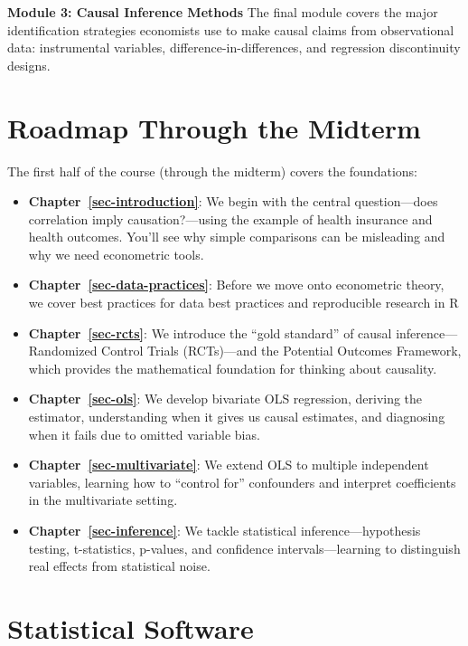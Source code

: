 \documentclass[
  letterpaper,
  DIV=11,
  numbers=noendperiod]{scrreprt}
\begin{document}
\textbf{Module 3: Causal Inference Methods} The final module covers the
major identification strategies economists use to make causal claims
from observational data: instrumental variables,
difference-in-differences, and regression discontinuity designs.

\section*{Roadmap Through the
Midterm}\label{roadmap-through-the-midterm}


The first half of the course (through the midterm) covers the
foundations:

\begin{itemize}
\item
  \textbf{Chapter~\ref{sec-introduction}}: We begin with the central
  question---does correlation imply causation?---using the example of
  health insurance and health outcomes. You'll see why simple
  comparisons can be misleading and why we need econometric tools.
\item
  \textbf{Chapter~\ref{sec-data-practices}}: Before we move onto
  econometric theory, we cover best practices for data best practices
  and reproducible research in R
\item
  \textbf{Chapter~\ref{sec-rcts}}: We introduce the ``gold standard'' of
  causal inference---Randomized Control Trials (RCTs)---and the
  Potential Outcomes Framework, which provides the mathematical
  foundation for thinking about causality.
\item
  \textbf{Chapter~\ref{sec-ols}}: We develop bivariate OLS regression,
  deriving the estimator, understanding when it gives us causal
  estimates, and diagnosing when it fails due to omitted variable bias.
\item
  \textbf{Chapter~\ref{sec-multivariate}}: We extend OLS to multiple
  independent variables, learning how to ``control for'' confounders and
  interpret coefficients in the multivariate setting.
\item
  \textbf{Chapter~\ref{sec-inference}}: We tackle statistical
  inference---hypothesis testing, t-statistics, p-values, and confidence
  intervals---learning to distinguish real effects from statistical
  noise.
\end{itemize}

\section*{Statistical Software}\label{statistical-software}
\end{document}
